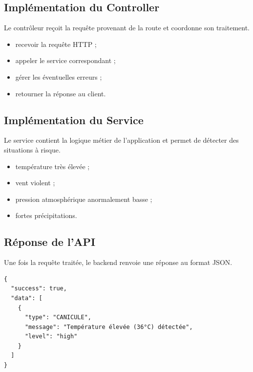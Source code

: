 \subsection{Implémentation du Controller}

\noindent Le contrôleur reçoit la requête provenant de la route et coordonne son traitement.

\begin{itemize}
\item recevoir la requête HTTP ;
\item appeler le service correspondant ;
\item gérer les éventuelles erreurs ;
\item retourner la réponse au client.
\end{itemize}

\subsection{Implémentation du Service}

\noindent Le service contient la logique métier de l’application et permet de détecter des situations à risque.

\begin{itemize}
\item température très élevée ;
\item vent violent ;
\item pression atmosphérique anormalement basse ;
\item fortes précipitations.
\end{itemize}

\subsection{Réponse de l’API}

\noindent Une fois la requête traitée, le backend renvoie une réponse au format JSON.

\begin{verbatim}
{
  "success": true,
  "data": [
    {
      "type": "CANICULE",
      "message": "Température élevée (36°C) détectée",
      "level": "high"
    }
  ]
}
\end{verbatim}
